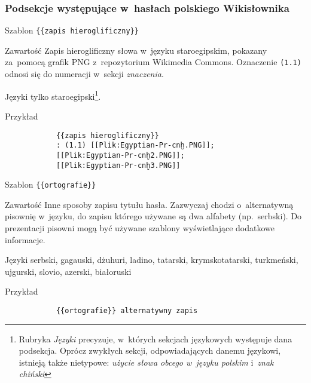 \documentclass{pracamgr}
\begin{document}
\subsubsection{Podsekcje występujące w~hasłach polskiego Wikisłownika}
\begin{description-sub}
	\item[Szablon] \verb|{{zapis hieroglificzny}}|
	\item[Zawartość] Zapis hieroglificzny słowa w~języku staroegipskim, pokazany za~pomocą grafik PNG z~repozytorium Wikimedia Commons. Oznaczenie \texttt{(1.1)} odnosi się do numeracji w~sekcji \emph{znaczenia}.
	\item[Języki] tylko staroegipski\footnote{Rubryka \emph{Języki} precyzuje, w~których sekcjach językowych występuje dana podsekcja. Oprócz zwykłych sekcji, odpowiadających danemu językowi, istnieją także nietypowe: \emph{użycie słowa obcego w~języku polskim} i~\emph{znak chiński}}.
	\item[Przykład]
		\begin{verbatim}
			{{zapis hieroglificzny}}
			: (1.1) [[Plik:Egyptian-Pr-cnḫ.PNG]];
			[[Plik:Egyptian-Pr-cnḫ2.PNG]];
			[[Plik:Egyptian-Pr-cnḫ3.PNG]]
		\end{verbatim}
\end{description-sub}
\spacer
\begin{description-sub}
	\item[Szablon] \verb|{{ortografie}}|
	\item[Zawartość] Inne sposoby zapisu tytułu hasła. Zazwyczaj chodzi o~alternatywną pisownię w~języku, do zapisu którego używane są dwa alfabety (np.\ serbski). Do prezentacji pisowni mogą być używane szablony wyświetlające dodatkowe informacje.
	\item[Języki] serbski, gagauski, dżuhuri, ladino, tatarski, krymskotatarski, turkmeński, ujgurski, slovio, azerski, białoruski
	\item[Przykład]
		\begin{verbatim}
			{{ortografie}} alternatywny zapis
		\end{verbatim}
\end{description-sub}
\spacer
\end{document}
